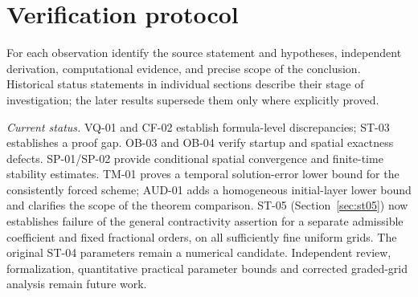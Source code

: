 \documentclass[11pt,a4paper]{amsart}
\theoremstyle{remark}
\theoremstyle{plain}
\theoremstyle{remark}
\numberwithin{equation}{section}
\begin{document}
\section{Verification protocol}
\label{sec:protocol}

For each observation identify the source statement and hypotheses, independent derivation, computational evidence, and precise scope of the conclusion. Historical status statements in individual sections describe their stage of investigation; the later results supersede them only where explicitly proved.

\noindent\textit{Current status.} VQ-01 and CF-02 establish formula-level discrepancies; ST-03 establishes a proof gap. OB-03 and OB-04 verify startup and spatial exactness defects. SP-01/SP-02 provide conditional spatial convergence and finite-time stability estimates. TM-01 proves a temporal solution-error lower bound for the consistently forced scheme; AUD-01 adds a homogeneous initial-layer lower bound and clarifies the scope of the theorem comparison. ST-05 (Section~\ref{sec:st05}) now establishes failure of the general contractivity assertion for a separate admissible coefficient and fixed fractional orders, on all sufficiently fine uniform grids. The original ST-04 parameters remain a numerical candidate. Independent review, formalization, quantitative practical parameter bounds and corrected graded-grid analysis remain future work.
\end{document}
